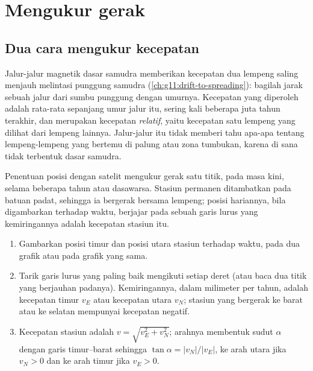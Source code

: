 \section{Mengukur gerak}

\subsection{Dua cara mengukur kecepatan}

Jalur-jalur magnetik dasar samudra memberikan kecepatan dua lempeng saling
menjauh melintasi punggung samudra (\cref{ch:g11:drift-to-spreading}): bagilah
jarak sebuah jalur dari sumbu punggung dengan umurnya. Kecepatan yang diperoleh
adalah rata-rata sepanjang umur jalur itu, sering kali beberapa juta tahun
terakhir, dan merupakan kecepatan \emph{relatif}, yaitu kecepatan satu lempeng
yang dilihat dari lempeng lainnya. Jalur-jalur itu tidak memberi tahu apa-apa
tentang lempeng-lempeng yang bertemu di palung atau zona tumbukan, karena di
sana tidak terbentuk dasar samudra.

Penentuan posisi dengan satelit mengukur gerak satu titik, pada masa kini,
selama beberapa tahun atau dasawarsa. Stasiun permanen ditambatkan pada batuan
padat, sehingga ia bergerak bersama lempeng; posisi hariannya, bila digambarkan
terhadap waktu, berjajar pada sebuah garis lurus yang kemiringannya adalah
kecepatan stasiun itu.

\begin{method}\label{met:g11:plate-motions:rate}
\begin{enumerate}
  \item Gambarkan posisi timur dan posisi utara stasiun terhadap
        waktu, pada dua grafik atau pada grafik yang sama.
  \item Tarik garis lurus yang paling baik mengikuti setiap deret (atau baca dua
        titik yang berjauhan padanya). Kemiringannya, dalam milimeter per tahun,
        adalah kecepatan timur $v_E$ atau kecepatan utara $v_N$; stasiun yang
        bergerak ke barat atau ke selatan mempunyai kecepatan negatif.
  \item Kecepatan stasiun adalah $v = \sqrt{v_E^2 + v_N^2}$; arahnya
        membentuk sudut $\alpha$ dengan garis timur--barat sehingga
        $\tan\alpha = |v_N|/|v_E|$, ke arah utara jika $v_N > 0$ dan ke arah
        timur jika $v_E > 0$.
\end{enumerate}
\end{method}

